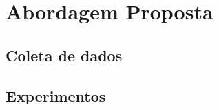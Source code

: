 \chapter{Abordagem Proposta} \label{chap:propApproach}
	\begin{myenv}{1.5}
		\section{Coleta de dados}
		
		\section{Experimentos}
		
	\end{myenv}